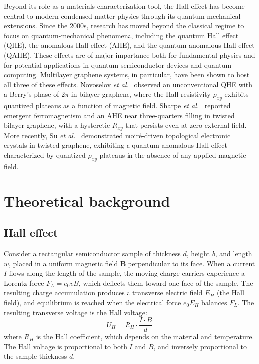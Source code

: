 \documentclass[%
 reprint,
 amsmath,amssymb,
 aps,
]{revtex4-2}
\begin{document}
Beyond its role as a materials characterization tool, the Hall effect has become central to modern condensed matter physics through its quantum-mechanical extensions. Since the 2000s, research has moved beyond the classical regime to focus on quantum-mechanical phenomena, including the quantum Hall effect (QHE), the anomalous Hall effect (AHE), and the quantum anomalous Hall effect (QAHE). These effects are of major importance both for fundamental physics and for potential applications in quantum semiconductor devices and quantum computing. Multilayer graphene systems, in particular, have been shown to host all three of these effects. Novoselov \textit{et al.}~\cite{novoselov2006} observed an unconventional QHE with a Berry's phase of $2\pi$ in bilayer graphene, where the Hall resistivity $\rho_{xy}$ exhibits quantized plateaus as a function of magnetic field. Sharpe \textit{et al.}~\cite{sharpe2019} reported emergent ferromagnetism and an AHE near three-quarters filling in twisted bilayer graphene, with a hysteretic $R_{xy}$ that persists even at zero external field. More recently, Su \textit{et al.}~\cite{su2025} demonstrated moir\'{e}-driven topological electronic crystals in twisted graphene, exhibiting a quantum anomalous Hall effect characterized by quantized $\rho_{xy}$ plateaus in the absence of any applied magnetic field.


\section{\label{sec:theory}Theoretical background}

\subsection{Hall effect}

Consider a rectangular semiconductor sample of thickness $d$, height $b$, and length $w$, placed in a uniform magnetic field $\mathbf{B}$ perpendicular to its face. When a current $I$ flows along the length of the sample, the moving charge carriers experience a Lorentz force $F_L = e_0 v B$, which deflects them toward one face of the sample. The resulting charge accumulation produces a transverse electric field $E_H$ (the Hall field), and equilibrium is reached when the electrical force $e_0 E_H$ balances $F_L$. The resulting transverse voltage is the Hall voltage:
\begin{equation}
  U_H = R_H \cdot \frac{I \cdot B}{d}
  \label{eq:hall-voltage}
\end{equation}
where $R_H$ is the Hall coefficient, which depends on the material and temperature. The Hall voltage is proportional to both $I$ and $B$, and inversely proportional to the sample thickness $d$.
\end{document}
